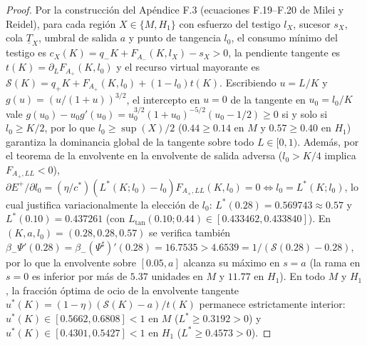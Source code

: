 \documentclass[11pt,letterpaper]{article}
\theoremstyle{plain}
\begin{document}
\begin{proof}
Por la construcción del Apéndice F.3 (ecuaciones F.19--F.20 de Milei y Reidel), para cada región $X\in\{M,H_1\}$ con esfuerzo del testigo $l_X$, sucesor $s_X$, cola $\underline{T}_X$, umbral de salida $a$ y punto de tangencia $l_0$, el consumo mínimo del testigo es $c_X(K)=q_- K + F_{A_-}(K,l_X)-s_X>0$, la pendiente tangente es $t(K)=\partial_L F_{A_+}(K,l_0)$ y el recurso virtual mayorante es $\mathcal{S}(K)=q_+K+F_{A_+}(K,l_0)+(1-l_0)t(K)$. Escribiendo $u=L/K$ y $g(u)=(u/(1+u))^{3/2}$, el intercepto en $u=0$ de la tangente en $u_0=l_0/K$ vale $g(u_0)-u_0 g'(u_0)=u_0^{3/2}(1+u_0)^{-5/2}(u_0-1/2)\ge 0$ si y solo si $l_0\ge K/2$, por lo que $l_0\ge \sup(X)/2$ ($0.44\ge 0.14$ en $M$ y $0.57\ge 0.40$ en $H_1$) garantiza la dominancia global de la tangente sobre todo $L\in[0,1)$. Además, por el teorema de la envolvente en la envolvente de salida adversa ($l_0>K/4$ implica $F_{A_+,LL}<0$), $\partial E^+/\partial l_0 = (\eta/c^*)(L^*(K;l_0)-l_0)F_{A_+,LL}(K,l_0)=0 \iff l_0=L^*(K;l_0)$, lo cual justifica variacionalmente la elección de $l_0$: $L^*(0.28)=0.569743\approx 0.57$ y $L^*(0.10)=0.437261$ (con $L_{\mathrm{tan}}(0.10;0.44)\in[0.433462,0.433840]$). En $(K,a,l_0)=(0.28,0.28,0.57)$ se verifica también $\beta_-\Psi'(0.28) = \beta_-(\Psi^\sharp)'(0.28) = 16.7535 > 4.6539 = 1/(\mathcal{S}(0.28)-0.28)$, por lo que la envolvente sobre $[0.05,a]$ alcanza su máximo en $s=a$ (la rama en $s=0$ es inferior por más de $5.37$ unidades en $M$ y $11.77$ en $H_1$). En todo $M$ y $H_1$, la fracción óptima de ocio de la envolvente tangente $u^*(K)=(1-\eta)(\mathcal{S}(K)-a)/t(K)$ permanece estrictamente interior: $u^*(K)\in[0.5662,0.6808]<1$ en $M$ ($L^*\ge 0.3192>0$) y $u^*(K)\in[0.4301,0.5427]<1$ en $H_1$ ($L^*\ge 0.4573>0$).


\end{proof}
\end{document}
